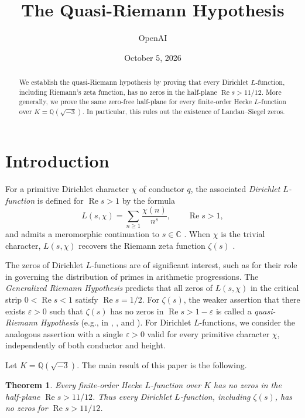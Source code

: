 \documentclass[11pt,a4paper]{article}
\title{The Quasi-Riemann Hypothesis}
\author{OpenAI}
\date{October 5, 2026}
\numberwithin{equation}{section}
\numberwithin{figure}{section}
\newtheorem{theorem}{Theorem}[section]
\theoremstyle{definition}
\theoremstyle{remark}
\newcommand{\Q}{\mathbb Q}
\newcommand{\C}{\mathbb C}
\newcommand{\Rea}{\operatorname{Re}}
\begin{document}
\maketitle
\begin{abstract}
We establish the quasi-Riemann hypothesis by proving that every Dirichlet $L$-function, including Riemann's zeta function, has no zeros in the half-plane $\Rea s>11/12$. More generally, we prove the same zero-free half-plane for every finite-order Hecke $L$-function over $K=\Q(\sqrt{-3})$. In particular, this rules out the existence of Landau--Siegel zeros.
\end{abstract}

\tableofcontents

\section{Introduction}\label{sec:intro}

For a primitive Dirichlet character $\chi$ of conductor $q$, the associated \emph{Dirichlet $L$-function} is defined for $\Rea s>1$ by the formula
\[
 L(s,\chi)=\sum_{n\ge1}\frac{\chi(n)}{n^s}, \qquad \Rea s>1,
\]
and admits a meromorphic continuation to $s \in \C$ \cite[\S4.6]{IK04}. When $\chi$ is the trivial character, $L(s, \chi)$ recovers the Riemann zeta function $\zeta(s)$ \cite{Rie59}.

The zeros of Dirichlet $L$-functions are of significant interest, such as for their role in governing the distribution of primes in arithmetic progressions. The \emph{Generalized Riemann Hypothesis} predicts that all zeros of $L(s, \chi)$ in the critical strip $0 < \Rea s < 1$ satisfy $\Rea s = 1/2$.
For $\zeta(s)$, the weaker assertion that there exists
$\varepsilon>0$ such that $\zeta(s)$ has no zeros in
$\Rea s>1-\varepsilon$ is called a \emph{quasi-Riemann Hypothesis}
(e.g., in \cite[\S1]{BG17}, \cite[p.~274]{MS02}, and \cite[\S2]{BR18}).
For Dirichlet $L$-functions, we consider the analogous assertion
with a single $\varepsilon>0$ valid for every primitive character
$\chi$, independently of both conductor and height.



Let $K=\Q(\sqrt{-3})$. The main result of this paper is the following.

\begin{theorem}\label{thm:main}
Every finite-order Hecke $L$-function over $K$ has no zeros in the half-plane $\Rea s>11/12$. Thus every Dirichlet $L$-function, including $\zeta(s)$, has no zeros for $\Rea s>11/12$.
\end{theorem}
\end{document}
